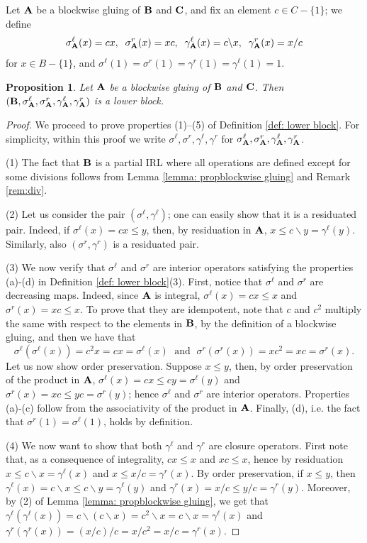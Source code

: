 \documentclass{amsart}
\newtheorem{proposition}[theorem]{Proposition}
\theoremstyle{definition}
\numberwithin{equation}{section}
\newcommand{\alg}[1]{{\textbf{\upshape #1}}}  %
\newcommand{\sell}{\sigma^\ell}
\newcommand{\sr}{\sigma^r}
\newcommand{\gell}{\gamma^\ell}
\newcommand{\gr}{\gamma^r}
\begin{document}
	Let $\alg A $ be a blockwise gluing of $\alg B$ and $\alg C$, and fix an element $c \in C - \{1\}$; we define
	$$
	\sell_{\alg A}(x) = cx,\;\; \sr_{\alg A}(x) = xc,\;\; \gell_{\alg A}(x)= c \backslash x,\;\;\gr_{\alg A}(x) = x / c
	$$
	 for $x \in B-\{1\}$, and $\sell(1) = \sr(1) = \gr(1) = \gell(1) = 1$.
	\begin{proposition}\label{prop: lower blocks with c}
		 Let $\alg A$ be a blockwise gluing of $\alg B$ and $\alg C$. Then $(\alg B, \sell_{\alg A}, \sr_{\alg A}, \gell_{\alg A}, \gr_{\alg A})$ is a lower block.
	\end{proposition}
	\begin{proof} 
	We proceed to prove properties (1)--(5) of Definition \ref{def: lower block}. For simplicity, within this proof we write $\sell, \sr,\gell, \gr$ for $\sell_{\alg A}, \sr_{\alg A}, \gell_{\alg A}, \gr_{\alg A}$.

	
		(1) The fact that $\alg B$ is a partial IRL where all operations are defined except for some divisions follows from Lemma \ref{lemma: propblockwise gluing} and Remark \ref{rem:div}. 		
		
		(2) Let us consider the pair $(\sell, \gell)$; one can easily show that it is a residuated pair. Indeed, if $\sell(x)=cx\leq y$, then, by residuation in $\alg A$, $x \leq c \backslash y=\gell(y)$. Similarly, also $(\sr, \gr)$ is a residuated pair. 
		
		(3) We now verify that $\sell$ and $\sr$ are interior operators satisfying the properties (a)-(d) in Definition \ref{def: lower block}(3). First, notice that $\sell$ and $\sr$ are decreasing maps. Indeed, since $\alg A$ is integral, $\sell(x)=cx\leq x$ and $\sr(x)=xc\leq x$. To prove that they are idempotent, note that $c$ and $c^2$ multiply the same with respect to the elements in $\alg B$, by the definition of a blockwise gluing, and then we have that $$\sell(\sell(x))=c^2x=cx=\sell(x) \;\mbox{ and }\; \sr(\sr(x))=xc^2=xc=\sr(x).$$ Let us now show order preservation. Suppose $x \leq y$, then, by order preservation of the product in $\alg A$, $\sell(x)=cx \leq cy =\sell(y)$ and $\sr(x)=xc \leq yc=\sr(y)$; hence $\sell$ and $\sr$ are interior operators. 
		Properties (a)-(c) follow from the associativity of the product in $\alg A$. Finally, (d), i.e. the fact that $\sr(1)=\sell(1)$, holds by definition. 	
			
		(4) We now want to show that both $\gell$ and $\gr$ are closure operators. First note that, as a consequence of integrality, $cx \leq x$ and $xc \leq x$, hence by residuation $x \leq c\backslash x =\gell(x)$ and $x \leq x/c=\gr(x)$. By order preservation, if $x \leq y$, then $\gell(x)=c \backslash x \leq c \backslash y=\gell(y)$ and $\gr(x)=x/c \leq y/c =\gr(y)$. Moreover, by (2) of Lemma \ref{lemma: propblockwise gluing}, we get that $\gell(\gell(x))=c \backslash (c \backslash x)=c^2 \backslash x= c \backslash x= \gell(x)$ and $\gr(\gr(x))=(x /c)/c=x /c^2=x/c=\gr(x)$. 
		

\end{proof}
\end{document}
